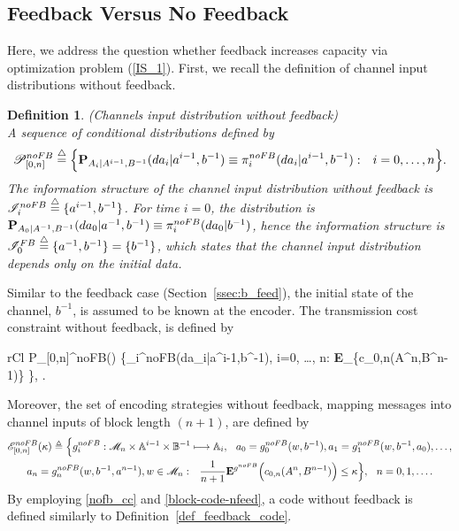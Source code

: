 \documentclass[11pt, a4paper, journal,onecolumn]{IEEEtran}
\newcommand{\mb}{\mathbb}
\newcommand{\sr}{\stackrel}
\newcommand{\tri}{\sr{\triangle}{=}}
\newcommand{\bea}{\begin{eqnarray}}
\newcommand{\eea}{\end{eqnarray}}
\newcommand{\beae}{\begin{IEEEeqnarray}{rCl}}
\newcommand{\eeae}{\end{IEEEeqnarray}}
\newcommand{\nms}{\IEEEeqnarraynumspace}
\newcommand{\hso}{\hspace{.1in}}
\newtheorem{definition}{Definition}[section]
\begin{document}
\subsection{Feedback Versus No Feedback}
\label{ch4bsscnf}
Here, we address the question whether feedback increases capacity via optimization problem (\ref{IS_1}). First, we recall the definition of channel input distributions without feedback.\\
\begin{definition}(Channels input distribution without feedback)\\
A sequence of conditional 
distributions  defined by
\bea
{\cal P}_{[0,n]}^{noFB} \tri \Big\{{\bf P}_{A_i|A^{i-1},B^{-1}}({da}_i|a^{i-1},b^{-1}) \equiv \pi_i^{noFB}(da_i|a^{i-1},b^{-1}): \hso i=0, \ldots, n\Big\}.\label{nofb_cid}
\eea
The information structure of the channel input distribution without feedback is ${\cal I}_i^{noFB}\tri  \{a^{i-1},b^{-1}\}$. For time $i=0$, the distribution is ${\bf P}_{A_0|A^{-1},B^{-1}}({da}_0|a^{-1},b^{-1}) \equiv \pi_i^{noFB}(da_0|b^{-1})$, hence the information structure is  ${\cal I}_0^{FB}\tri \{a^{-1}, b^{-1}\}=\{b^{-1}\}$, which states that the channel input distribution depends only on the initial data.
\end{definition}
\par Similar to the feedback case (Section~\ref{ssec:b_feed}), the initial state of the channel, $b^{-1}$, is assumed to be known at the encoder.  The transmission cost constraint without feedback, is defined by 
\beae
{\cal P}_{[0,n]}^{noFB}(\kappa) {\tri} \Big\{\pi_i^{noFB}(da_i|a^{i-1},b^{-1}), i=0, \ldots, n:  {} {\bf E}_\mu \big\{c_{0,n}(A^n,B^{n{-}1})\big\} \leq \kappa\Big\}, \hso \kappa\in[0,\infty]. \label{nofb_cc} \nms
\eeae
Moreover, the set of encoding strategies without feedback,  mapping messages  into channel inputs of block length $(n+1)$, are defined by
\begin{multline}\label{block-code-nfeed}
{\cal E}_{[0,n]}^{noFB}(\kappa) \triangleq  \Big\{g^{noFB}_i: {\cal M}_n \times {\mathbb A}^{i-1} \times {\mb B}^{-1}  \longmapsto {\mb A}_i, \hso  a_0=g^{noFB}_0(w, b^{-1}), a_1=g^{noFB}_1(w,b^{-1},a_0),\ldots, \\ a_n=g^{noFB}_n(w,b^{-1}, a^{n-1}), 
  w\in {\cal M}_n: \hso  \frac{1}{n+1} {\bf E}^{g^{noFB}}\Big(c_{0,n}(A^n,B^{n-1})\Big)\leq \kappa  \Big\}, \hso n=0, 1, \ldots. 
\end{multline}
By employing \eqref{nofb_cc} and \eqref{block-code-nfeed}, a code without feedback is defined similarly to Definition~\ref{def_feedback_code}. 
\end{document}
